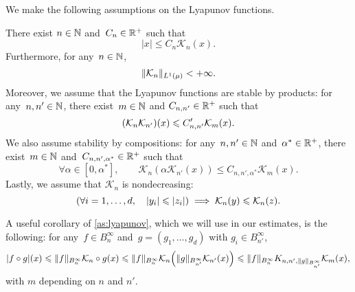 We make the following assumptions on the Lyapunov functions.

\begin{assumption}
\label{as:lyapunov}
%
There exist $n\in\N$ and~$C_n\in\R^+$ such that
%
\begin{equation}
	|x| \leq C_n\mathcal{K}_n(x).
	\label{eq:lyap_identity}
\end{equation}
%
Furthermore, for any~$n\in\N$,
%
\begin{equation}
	\norm{\mathcal{K}_n}_{L^1(\mu)} < +\infty.
	\label{eq:lyap_L1}
\end{equation}
%
Moreover, we assume that the Lyapunov functions are stable by products: for any~$n,n'\in\N$, there exist~$m\in\N$ and $C_{n,n'}\in\R^+$ such that
%
\begin{equation}
	\paren*{\mathcal{K}_n\mathcal{K}_{n'}}(x) \leq C'_{n,n'}\mathcal{K}_m(x).
	\label{eq:lyap_prod}
\end{equation}
%
We also assume stability by compositions: for any~$n,n'\in\N$ and~$\alpha^*\in\R^+$, there exist~$m\in\N$ and~$C_{n,n',\alpha^*}\in\R^+$ such that
%
\begin{equation}
	\forall\alpha \in [0,\alpha^*], \qquad \mathcal{K}_n(\alpha\mathcal{K}_{n'}(x)) \leq C_{n,n',\alpha^*}\mathcal{K}_m(x).
	\label{eq:lyap_comp}
\end{equation}
%
Lastly, we assume that $\mathcal{K}_n$ is nondecreasing:
%
\begin{equation}
	\paren*{\forall i = 1,\dotsc,d, \quad |y_i| \leq |z_i|} \implies \mathcal{K}_n(y) \leq \mathcal{K}_n(z).
\end{equation}
%
\end{assumption}

%
A useful corollary of \cref{as:lyapunov}, which we will use in our estimates, is the following: for any~$f\in B^\infty_{n}$ and~$g = (g_1,\dotsc,g_d)$ with $g_i \in B^\infty_{n'}$, %
%
\begin{align}
	|f\circ g|(x) \leq \|f\|_{B_{n}^\infty}\mathcal{K}_{n} \circ g(x) %
	\leq \|f\|_{B_{n}^\infty}\mathcal{K}_{n}\paren*{\|g\|_{B^\infty_{n'}} \mathcal{K}_{n'}(x)} %
	\leq \norm{f}_{B^\infty_n}K_{n,n',\|g\|_{B^\infty_{n'}}}\mathcal{K}_{m}(x),
	\label{eq:lyap_composition_cor}
\end{align}
%
with $m$ depending on $n$ and $n'$.
%

